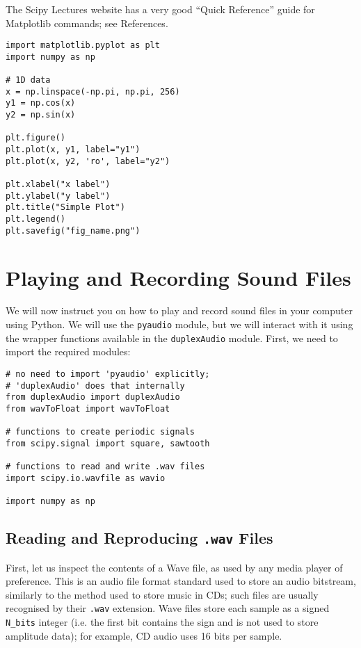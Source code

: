 The Scipy Lectures website has a very good ``Quick Reference'' guide for Matplotlib commands; see References.

\begin{lstlisting}[frame=single]
import matplotlib.pyplot as plt
import numpy as np

# 1D data
x = np.linspace(-np.pi, np.pi, 256)
y1 = np.cos(x)
y2 = np.sin(x)

plt.figure()
plt.plot(x, y1, label="y1")
plt.plot(x, y2, 'ro', label="y2")

plt.xlabel("x label")
plt.ylabel("y label")
plt.title("Simple Plot")
plt.legend()
plt.savefig("fig_name.png")

\end{lstlisting}


\section{Playing and Recording Sound Files}

We will now instruct you on how to play and record sound files in your computer using Python. We will use the {\tt pyaudio} module, but we will interact with it using the wrapper functions available in the {\tt duplexAudio} module. First, we need to import the required modules:

\begin{lstlisting}[frame=single]
# no need to import 'pyaudio' explicitly;
# 'duplexAudio' does that internally
from duplexAudio import duplexAudio
from wavToFloat import wavToFloat

# functions to create periodic signals
from scipy.signal import square, sawtooth

# functions to read and write .wav files
import scipy.io.wavfile as wavio

import numpy as np
\end{lstlisting}

\subsection{Reading and Reproducing {\tt .wav} Files}

First, let us inspect the contents of a Wave file, as used by any media player of preference. This is an audio file format standard used to store an audio bitstream, similarly to the method used to store music in CDs; such files are usually recognised by their {\tt .wav} extension. Wave files store each sample as a signed {\tt N\_bits} integer (i.e. the first bit contains the sign and is not used to store amplitude data); for example, CD audio uses 16 bits per sample.

